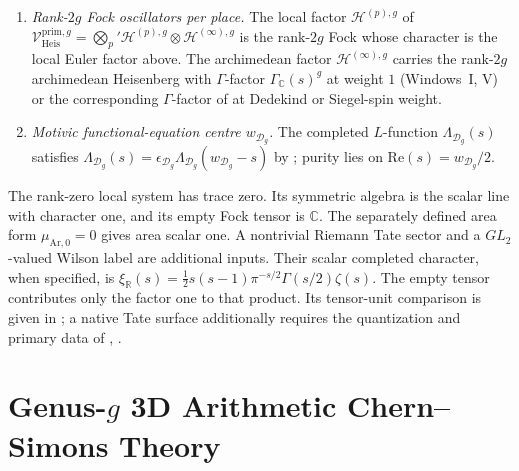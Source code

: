 \begin{enumerate}
the five affine fibres have respectively $1,1,2,2,1$ points.
The arithmetic Tate-module trace is $5+1-8=-2$ and determinant $5$;
its geometric trace is $-2/5$ and determinant $1/5$.
Dualizing recovers trace $-2$ and determinant $5$ for geometric
Frobenius on $H^1$. The pairing convention is the one in Milne,
\emph{Elliptic Curves}, second edition, V~\S8, p.~221.
\item \emph{Rank-\(2g\) Fock oscillators per place.} The local factor
\(\mathcal{H}^{(p),g}\) of
\(\mathcal{V}^{\mathrm{prim},g}_{\mathrm{Heis}}=\bigotimes_{p}'\mathcal{H}^{(p),g}\otimes\mathcal{H}^{(\infty),g}\)
is the rank-\(2g\) Fock whose character is the local Euler factor above.
The archimedean factor \(\mathcal{H}^{(\infty),g}\) carries the
rank-\(2g\) archimedean Heisenberg with \(\Gamma\)-factor
\(\Gamma_{\mathbb{C}}(s)^{g}\) at weight \(1\) (Windows~I, V) or the
corresponding \(\Gamma\)-factor of
 at Dedekind or Siegel-spin weight.
\item \emph{Motivic functional-equation centre
\(w_{\mathcal{D}_{g}}\).} The completed \(L\)-function
\(\Lambda_{\mathcal{D}_{g}}(s)\) satisfies
\(\Lambda_{\mathcal{D}_{g}}(s)=\epsilon_{\mathcal{D}_{g}}\Lambda_{\mathcal{D}_{g}}(w_{\mathcal{D}_{g}}-s)\)
by ; purity lies on
\(\mathrm{Re}(s)=w_{\mathcal{D}_{g}}/2\).
\end{enumerate}

\begin{remark}[degeneration at \(g=0\)]
\label{v4-arith:w9-r6:rem:g-zero}
The rank-zero local system has trace zero. Its symmetric algebra
is the scalar line with character one, and its empty Fock tensor
is \(\mathbb C\). The separately defined area form
\(\mu_{\mathrm{Ar},0}=0\) gives area scalar one.
A nontrivial Riemann Tate sector and a \(GL_2\)-valued Wilson label
are additional inputs. Their scalar completed character, when
specified, is
\(\xi_{\mathbb R}(s)=\tfrac12s(s-1)\pi^{-s/2}\Gamma(s/2)\zeta(s)\).
The empty tensor contributes only the factor one to that product.
Its tensor-unit comparison is given in
; a native Tate surface additionally
requires the quantization and primary data of
, .
\end{remark}
\section{Genus-\(g\) 3D Arithmetic Chern--Simons Theory}
\label{v4-arith:w9-r6:3d-acs-g}

